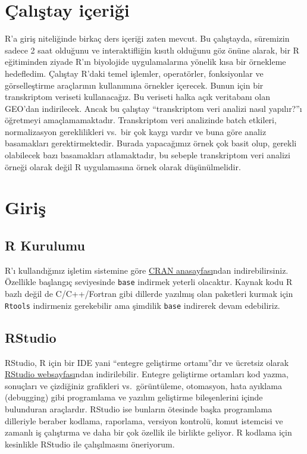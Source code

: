 \documentclass[
]{book}
\begin{document}
\hypertarget{uxe7alux131ux15ftay-iuxe7eriux11fi}{%
\chapter{Çalıştay içeriği}\label{uxe7alux131ux15ftay-iuxe7eriux11fi}}

R'a giriş niteliğinde birkaç ders içeriği zaten mevcut. Bu çalıştayda, süremizin sadece 2 saat olduğunu ve interaktifliğin kısıtlı olduğunu göz önüne alarak, bir R eğitiminden ziyade R'ın biyolojide uygulamalarına yönelik kısa bir örnekleme hedefledim. Çalıştay R'daki temel işlemler, operatörler, fonksiyonlar ve görselleştirme araçlarının kullanımına örnekler içerecek. Bunun için bir transkriptom veriseti kullanacağız. Bu veriseti halka açık veritabanı olan GEO'dan indirilecek. Ancak bu çalıştay ``transkriptom veri analizi nasıl yapılır?''ı öğretmeyi amaçlamamaktadır. Transkriptom veri analizinde batch etkileri, normalizasyon gereklilikleri vs.~bir çok kaygı vardır ve buna göre analiz basamakları gerektirmektedir. Burada yapacağımız örnek çok basit olup, gerekli olabilecek bazı basamakları atlamaktadır, bu sebeple transkriptom veri analizi örneği olarak değil R uygulamasına örnek olarak düşünülmelidir.

\hypertarget{giriux15f}{%
\chapter{Giriş}\label{giriux15f}}

\hypertarget{r-kurulumu}{%
\section{R Kurulumu}\label{r-kurulumu}}

R'ı kullandığınız işletim sistemine göre \href{https://cran.r-project.org/}{CRAN anasayfası}ndan indirebilirsiniz. Özellikle başlangıç seviyesinde \texttt{base} indirmek yeterli olacaktır. Kaynak kodu R bazlı değil de C/C++/Fortran gibi dillerde yazılmış olan paketleri kurmak için \texttt{Rtools} indirmeniz gerekebilir ama şimdilik \texttt{base} indirerek devam edebiliriz.

\hypertarget{rstudio}{%
\section{RStudio}\label{rstudio}}

RStudio, R için bir IDE yani ``entegre geliştirme ortamı''dır ve ücretsiz olarak \href{https://www.rstudio.com/}{RStudio websayfası}ndan indirilebilir. Entegre geliştirme ortamları kod yazma, sonuçları ve çizdiğiniz grafikleri vs.~görüntüleme, otomasyon, hata ayıklama (debugging) gibi programlama ve yazılım geliştirme bileşenlerini içinde bulunduran araçlardır. RStudio ise bunların ötesinde başka programlama dilleriyle beraber kodlama, raporlama, versiyon kontrolü, komut istemcisi ve zamanlı iş çalıştırma ve daha bir çok özellik ile birlikte geliyor. R kodlama için kesinlikle RStudio ile çalışılmasını öneriyorum.
\end{document}
